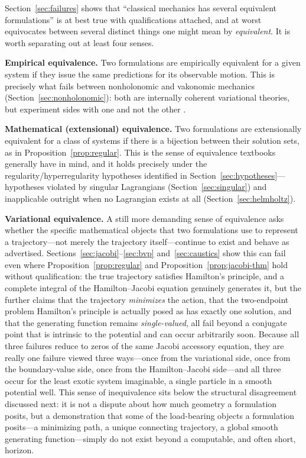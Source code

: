\documentclass[11pt]{article}
\begin{document}
Section~\ref{sec:failures} shows that ``classical mechanics has several equivalent formulations'' is at best true with qualifications attached, and at worst equivocates between several distinct things one might mean by \emph{equivalent}. It is worth separating out at least four senses.

\textbf{Empirical equivalence.} Two formulations are empirically equivalent for a given system if they issue the same predictions for its observable motion. This is precisely what fails between nonholonomic and vakonomic mechanics (Section~\ref{sec:nonholonomic}): both are internally coherent variational theories, but experiment sides with one and not the other \citep{lewismurray1995}.

\textbf{Mathematical (extensional) equivalence.} Two formulations are extensionally equivalent for a class of systems if there is a bijection between their solution sets, as in Proposition~\ref{prop:regular}. This is the sense of equivalence textbooks generally have in mind, and it holds precisely under the regularity/hyperregularity hypotheses identified in Section~\ref{sec:hypotheses}---hypotheses violated by singular Lagrangians (Section~\ref{sec:singular}) and inapplicable outright when no Lagrangian exists at all (Section~\ref{sec:helmholtz}).

\textbf{Variational equivalence.} A still more demanding sense of equivalence asks whether the specific mathematical objects that two formulations use to represent a trajectory---not merely the trajectory itself---continue to exist and behave as advertised. Sections~\ref{sec:jacobi}--\ref{sec:bvp} and~\ref{sec:caustics} show this can fail even where Proposition~\ref{prop:regular} and Proposition~\ref{prop:jacobi-thm} hold without qualification: the true trajectory satisfies Hamilton's principle, and a complete integral of the Hamilton--Jacobi equation genuinely generates it, but the further claims that the trajectory \emph{minimizes} the action, that the two-endpoint problem Hamilton's principle is actually posed as has exactly one solution, and that the generating function remains \emph{single-valued}, all fail beyond a conjugate point that is intrinsic to the potential and can occur arbitrarily soon. Because all three failures reduce to zeros of the same Jacobi accessory equation, they are really one failure viewed three ways---once from the variational side, once from the boundary-value side, once from the Hamilton--Jacobi side---and all three occur for the least exotic system imaginable, a single particle in a smooth potential well. This sense of inequivalence sits below the structural disagreement discussed next: it is not a dispute about how much geometry a formulation posits, but a demonstration that some of the load-bearing objects a formulation posits---a minimizing path, a unique connecting trajectory, a global smooth generating function---simply do not exist beyond a computable, and often short, horizon.
\end{document}
